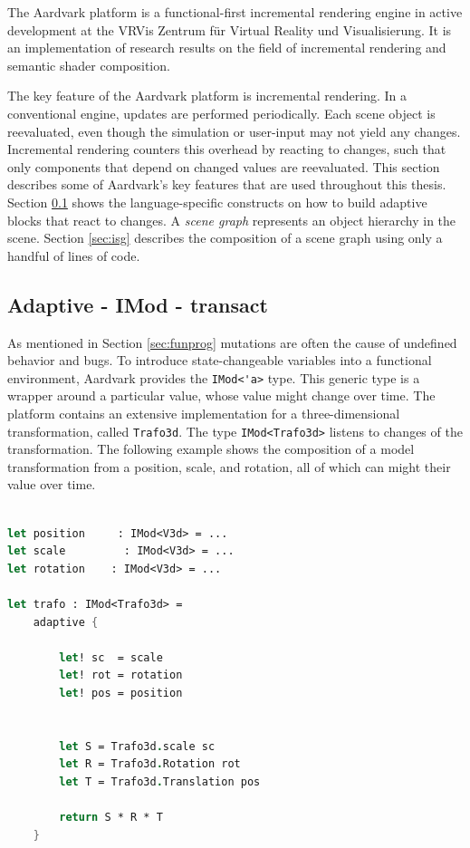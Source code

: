 The Aardvark platform\cite{aardvark} is a functional-first incremental rendering engine in active development at the VRVis Zentrum für Virtual Reality und Visualisierung\cite{vrvis}. It is an implementation of research results on the field of incremental rendering \cite{worister2013lazy, haaser2015incremental} and semantic shader composition\cite{haaser2014cosmo, haaser2014semantic}. 

The key feature of the Aardvark platform is incremental rendering. In a conventional engine, updates are performed periodically. Each scene object is reevaluated, even though the simulation or user-input may not yield any changes. Incremental rendering counters this overhead by reacting to changes, such that only components that depend on changed values are reevaluated. This section describes some of Aardvark's key features that are used throughout this thesis. Section \ref{sec:adaptive} shows the language-specific constructs on how to build adaptive blocks that react to changes. A \textit{scene graph} represents an object hierarchy in the scene. Section \ref{sec:isg} describes the composition of a scene graph using only a handful of lines of code. 

 
\subsection{Adaptive - IMod - transact}
\label{sec:adaptive}

As mentioned in Section \ref{sec:funprog} mutations are often the cause of undefined behavior and bugs. To introduce state-changeable variables into a functional environment, Aardvark provides the \verb|IMod<'a>| type. This generic type is a wrapper around a particular value, whose value might change over time. The platform contains an extensive implementation for a three-dimensional transformation, called \verb|Trafo3d|. The type \verb|IMod<Trafo3d>| listens to changes of the transformation. The following example shows the composition of a model transformation from a position, scale, and rotation, all of which can might their value over time. 

\begin{lstlisting}[language = FSharp]

let position     : IMod<V3d> = ... 
let scale         : IMod<V3d> = ... 
let rotation    : IMod<V3d> = ...

let trafo : IMod<Trafo3d> = 
    adaptive {
    
        let! sc  = scale
        let! rot = rotation
        let! pos = position
        
        
        let S = Trafo3d.scale sc
        let R = Trafo3d.Rotation rot
        let T = Trafo3d.Translation pos
        
        return S * R * T
    }
\end{lstlisting}

